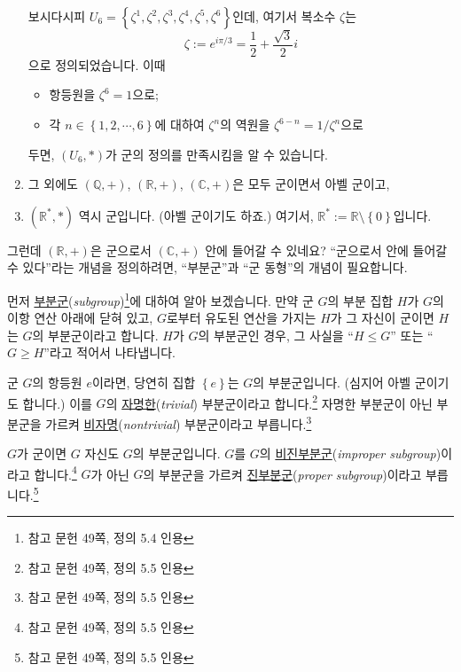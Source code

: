 \documentclass[12pt]{paper}
\begin{document}
\begin{enumerate}
    보시다시피 $U_6 = \left\{ \zeta^1 , \zeta^2 , \zeta^3 , \zeta^4 , \zeta^5 , \zeta^6 \right\}$인데,
    여기서 복소수 $\zeta$는 $$\zeta := e^{i \pi / 3} = \frac{1}{2} + \frac{\sqrt{3}}{2} i$$으로 정의되었습니다.
    이때
    \begin{itemize}
      \item 항등원을 $\zeta^6 = 1$으로;
      \item 각 $n \in \left\{ 1 , 2 , \cdots , 6 \right\}$에 대하여
      $ \zeta^n $의 역원을 $ \zeta^{6 - n} = 1 / \zeta^{n} $으로
    \end{itemize}
    두면,
    $\left( U_6 , * \right)$가 군의 정의를 만족시킴을 알 수 있습니다.
    
    \item 그 외에도 $\left( \mathbb{Q} , + \right)$, $\left( \mathbb{R} , + \right)$, $\left( \mathbb{C} , + \right)$은 모두 군이면서 아벨 군이고,

    \item $\left( \mathbb{R}^{*} , * \right)$ 역시 군입니다. (아벨 군이기도 하죠.)
    여기서, $\mathbb{R}^{*} := \mathbb{R} \setminus \left\{ 0 \right\}$입니다.

  \end{enumerate}

  그런데 $\left( \mathbb{R} , + \right)$은 군으로서 $\left( \mathbb{C} , + \right)$ 안에 들어갈 수 있네요?
  ``군으로서 안에 들어갈 수 있다''라는 개념을 정의하려면, ``부분군''과 ``군 동형''의 개념이 필요합니다.

  먼저 \underline{부분군}(\textit{subgroup})\footnote{참고 문헌 \cite{fraleigh2009} 49쪽, 정의 5.4 인용}에 대하여 알아 보겠습니다.
  만약 군 $G$의 부분 집합 $H$가 $G$의 이항 연산 아래에 닫혀 있고,
  $G$로부터 유도된 연산을 가지는 $H$가 그 자신이 군이면 $H$는 $G$의 부분군이라고 합니다.
  $H$가 $G$의 부분군인 경우, 그 사실을 ``$H \leq G$'' 또는 ``$G \geq H$''라고 적어서 나타냅니다.

  군 $G$의 항등원 $e$이라면, 당연히 집합 $\left\{ e \right\}$는 $G$의 부분군입니다.
  (심지어 아벨 군이기도 합니다.)
  이를 $G$의 \underline{자명한}(\textit{trivial}) 부분군이라고 합니다.\footnote{참고 문헌 \cite{fraleigh2009} 49쪽, 정의 5.5 인용}
  자명한 부분군이 아닌 부분군을 가르켜 \underline{비자명}(\textit{nontrivial}) 부분군이라고 부릅니다.\footnote{참고 문헌 \cite{fraleigh2009} 49쪽, 정의 5.5 인용}

  $G$가 군이면 $G$ 자신도 $G$의 부분군입니다.
  $G$를 $G$의 \underline{비진부분군}(\textit{improper subgroup})이라고 합니다.\footnote{참고 문헌 \cite{fraleigh2009} 49쪽, 정의 5.5 인용}
  $G$가 아닌 $G$의 부분군을 가르켜 \underline{진부분군}(\textit{proper subgroup})이라고 부릅니다.\footnote{참고 문헌 \cite{fraleigh2009} 49쪽, 정의 5.5 인용}
\end{document}
